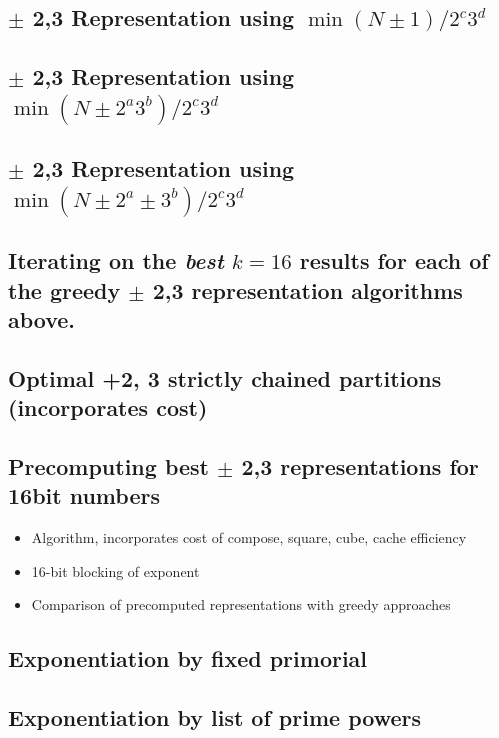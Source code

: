 \documentclass{ucalgthes1}
\theoremstyle{definition}
\begin{document}
\subsection{$\pm$ 2,3 Representation using $\min (N \pm 1) / 2^c3^d$}

\subsection{$\pm$ 2,3 Representation using $\min (N \pm 2^a3^b) / 2^c 3^d$}

\subsection{$\pm$ 2,3 Representation using $\min (N \pm 2^a \pm 3^b)/2^c3^d$}

\subsection{Iterating on the \emph{best} $k=16$ results for each of the greedy $\pm$ 2,3 representation algorithms above.}

\subsection{Optimal +2, 3 strictly chained partitions (incorporates cost)}

\subsection{Precomputing best $\pm$ 2,3 representations for 16bit numbers}
\begin{itemize}
\item Algorithm, incorporates cost of compose, square, cube, cache efficiency
\item 16-bit blocking of exponent
\item Comparison of precomputed representations with greedy approaches
\end{itemize}

\subsection{Exponentiation by fixed primorial}

\subsection{Exponentiation by list of prime powers}
\end{document}
